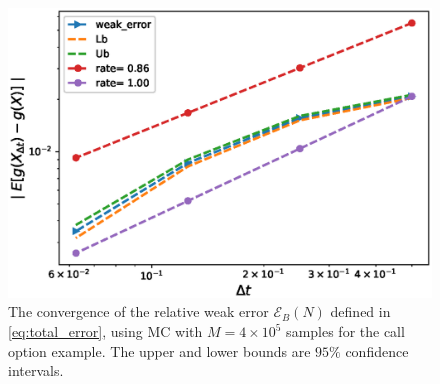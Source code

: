 


\begin{figure}[h!]
	\centering
		\includegraphics[width=0.5\linewidth]{./figures/weak_error_rates_call/Beta_32/without_rich/weak_convergence_order_call_option_relative_M_4_10_5}
	
	\caption{The convergence of the relative weak error  $\mathcal{E}_B(N)$ defined in \ref{eq:total_error}, using MC with $M=4 \times 10^5$ samples  for the call option example. The upper and lower bounds are $95\%$ confidence intervals.}
	\label{fig:Weak_rate_call_beta_32}
\end{figure}

%	


